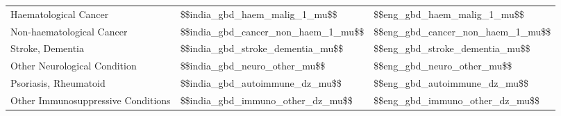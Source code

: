 \begin{tabular}{p{7cm}p{1.1cm}p{1cm}}
Haematological Cancer & \num{$$india_gbd_haem_malig_1_mu$$} & \num{$$eng_gbd_haem_malig_1_mu$$}\\[0.25ex]
Non-haematological Cancer & \num{$$india_gbd_cancer_non_haem_1_mu$$} & \num{$$eng_gbd_cancer_non_haem_1_mu$$} \\[0.25ex]
Stroke, Dementia & \num{$$india_gbd_stroke_dementia_mu$$} & \num{$$eng_gbd_stroke_dementia_mu$$} \\[0.25ex]
Other Neurological Condition & \num{$$india_gbd_neuro_other_mu$$} & \num{$$eng_gbd_neuro_other_mu$$} \\[0.25ex]
Psoriasis, Rheumatoid & \num{$$india_gbd_autoimmune_dz_mu$$} & \num{$$eng_gbd_autoimmune_dz_mu$$} \\[0.25ex]
Other Immunosuppressive Conditions & \num{$$india_gbd_immuno_other_dz_mu$$} & \num{$$eng_gbd_immuno_other_dz_mu$$} \\[0.25ex]
\end{tabular}
